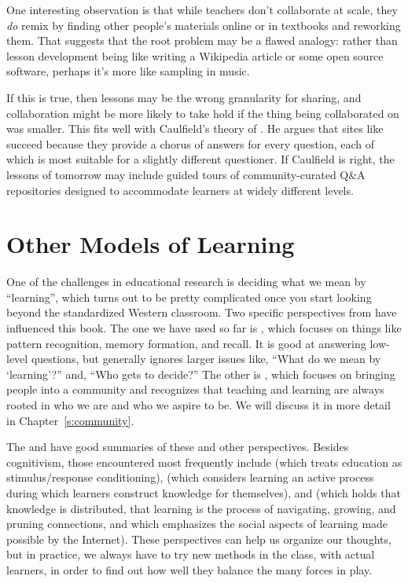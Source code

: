 One interesting observation is that while teachers don't collaborate
at scale, they \emph{do} remix by finding other people's materials online
or in textbooks and reworking them. That suggests that the root
problem may be a flawed analogy: rather than lesson development being
like writing a Wikipedia article or some open source software, perhaps
it's more like sampling in music.

If this is true, then lessons may be the wrong granularity for
sharing, and collaboration might be more likely to take hold if the
thing being collaborated on was smaller. This fits well with
Caulfield's theory of . He
argues that sites like  succeed
because they provide a chorus of answers for every question, each of
which is most suitable for a slightly different questioner. If
Caulfield is right, the lessons of tomorrow may include guided tours
of community-curated Q\&A repositories designed to accommodate learners
at widely different levels.

\section{Other Models of Learning}\label{s:process-theory}

One of the challenges in educational research is deciding what we mean by ``learning'',
which turns out to be pretty complicated
once you start looking beyond the standardized Western classroom.
Two specific perspectives from 
have influenced this book.
The one we have used so far is ,
which focuses on things like pattern recognition, memory formation, and recall.
It is good at answering low-level questions,
but generally ignores larger issues like,
``What do we mean by `learning'?'' and, ``Who gets to decide?''
The other is ,
which focuses on bringing people into a community
and recognizes that
teaching and learning are always rooted in who we are and who we aspire to be.
We will discuss it in more detail in Chapter~\ref{s:community}.

The  and \cite{Wibu2016}
have good summaries of these and other perspectives.
Besides cognitivism,
those encountered most frequently include 
(which treats education as stimulus/response conditioning),
(which considers learning an active process during which learners construct knowledge for themselves),
and 
(which holds that knowledge is distributed,
that learning is the process of navigating, growing, and pruning connections,
and which emphasizes the social aspects of learning made possible by the Internet).
These perspectives can help us organize our thoughts,
but in practice,
we always have to try new methods in the class,
with actual learners,
in order to find out how well they balance the many forces in play.

